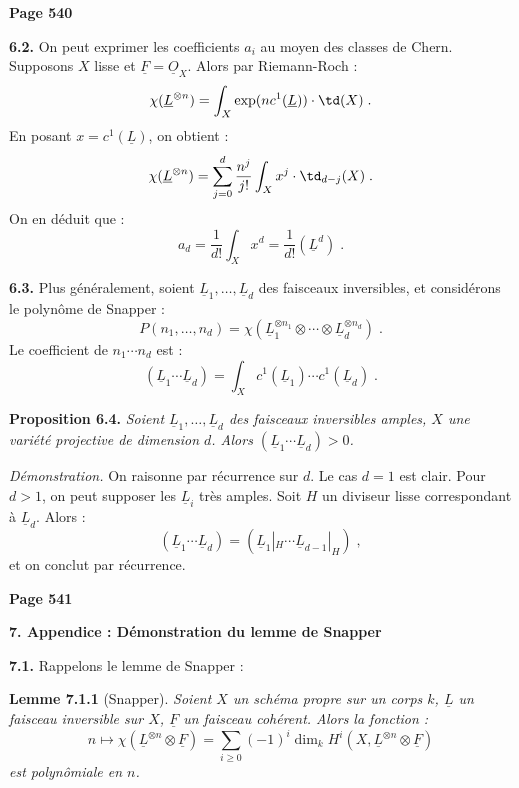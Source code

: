 \newpage
\noindent\textbf{Page 540}

\smallskip
\noindent\textbf{6.2.} On peut exprimer les coefficients $a_i$ au moyen des classes de Chern. Supposons $X$ lisse et $\underline{F} = \underline{O}_X$. Alors par Riemann-Roch :
\[
\chi(\underline{L}^{\otimes n}) = \int_X \exp(n c^1(\underline{L})) \cdot \td(X)\;.
\]
En posant $x = c^1(\underline{L})$, on obtient :
\[
\chi(\underline{L}^{\otimes n}) = \sum_{j=0}^d \frac{n^j}{j!} \int_X x^j \cdot \td_{d-j}(X)\;.
\]
On en d\'eduit que :
\[
a_d = \frac{1}{d!} \int_X x^d = \frac{1}{d!} (\underline{L}^d)\;.
\]

\smallskip
\noindent\textbf{6.3.} Plus g\'en\'eralement, soient $\underline{L}_1, \ldots, \underline{L}_d$ des faisceaux inversibles, et consid\'erons le polyn\^ome de Snapper :
\[
P(n_1, \ldots, n_d) = \chi(\underline{L}_1^{\otimes n_1} \otimes \cdots \otimes \underline{L}_d^{\otimes n_d})\;.
\]
Le coefficient de $n_1 \cdots n_d$ est :
\[
(\underline{L}_1 \cdots \underline{L}_d) = \int_X c^1(\underline{L}_1) \cdots c^1(\underline{L}_d)\;.
\]

\smallskip
\noindent\textbf{Proposition 6.4.} \textit{Soient $\underline{L}_1, \ldots, \underline{L}_d$ des faisceaux inversibles amples, $X$ une vari\'et\'e projective de dimension $d$. Alors $(\underline{L}_1 \cdots \underline{L}_d) > 0$.}

\textit{D\'emonstration.} On raisonne par r\'ecurrence sur $d$. Le cas $d = 1$ est clair. Pour $d > 1$, on peut supposer les $\underline{L}_i$ tr\`es amples. Soit $H$ un diviseur lisse correspondant \`a $\underline{L}_d$. Alors :
\[
(\underline{L}_1 \cdots \underline{L}_d) = (\underline{L}_1|_H \cdots \underline{L}_{d-1}|_H)\;,
\]
et on conclut par r\'ecurrence.

\newpage
\noindent\textbf{Page 541}

\smallskip
\noindent\textbf{7. Appendice : D\'emonstration du lemme de Snapper}

\smallskip
\noindent\textbf{7.1.} Rappelons le lemme de Snapper :

\smallskip
\noindent\textbf{Lemme 7.1.1} (Snapper). \textit{Soient $X$ un sch\'ema propre sur un corps $k$, $\underline{L}$ un faisceau inversible sur $X$, $\underline{F}$ un faisceau coh\'erent. Alors la fonction :
\[
n \longmapsto \chi(\underline{L}^{\otimes n} \otimes \underline{F}) = \sum_{i \geq 0} (-1)^i \dim_k H^i(X, \underline{L}^{\otimes n} \otimes \underline{F})
\]
est polyn\^omiale en $n$.}

